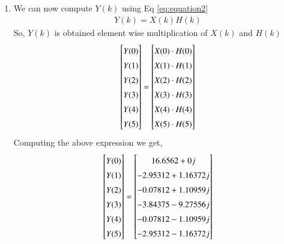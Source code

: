 \documentclass[journal,12pt,twocolumn]{IEEEtran}
\renewcommand\thesection{\arabic{section}}
\begin{document}
\begin{enumerate}[label=\thesection.\arabic*.,ref=\thesection.\theenumi]
\item We can now compute $Y(k)$ using 	Eq \eqref{eq:equation2}
\begin{align}
    Y(k) = X(k)H(k)
    \label{eq:equation2}
\end{align}
So, $Y(k)$ is obtained element wise multiplication of $X(k)$ and $H(k)$
\begin{equation}
\renewcommand{\arraystretch}{1.45}
\setlength\arraycolsep{0.01pt}
\begin{bmatrix} 
Y(0) \\ Y(1) \\ Y(2) \\ Y(3) \\ Y(4) \\ Y(5) 
\end{bmatrix}
=
\begin{bmatrix}
X(0)\cdot H(0) \\ X(1)\cdot H(1) \\ X(2)\cdot H(2) \\ X(3)\cdot H(3) \\ X(4)\cdot H(4) \\ X(5)\cdot H(5)
\end{bmatrix}
\end{equation}
Computing the above expression we get,
\begin{equation}
\renewcommand{\arraystretch}{1.45}
\setlength\arraycolsep{0.01pt}
\begin{bmatrix} 
Y(0) \\ Y(1) \\ Y(2) \\ Y(3) \\ Y(4) \\ Y(5) 
\end{bmatrix}
=
\begin{bmatrix}
16.6562+0j \\ -2.95312+1.16372j \\ -0.07812+1.10959j \\ -3.84375-9.27556j \\ -0.07812-1.10959j \\ -2.95312-1.16372j 
\end{bmatrix}
\end{equation}
\end{enumerate}
\end{document}
